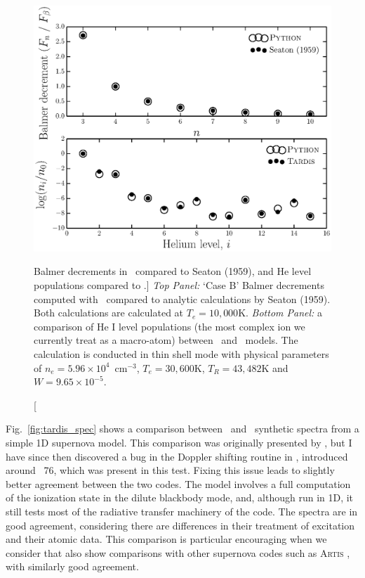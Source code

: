 \begin{figure}
\centering
\includegraphics[width=1.0\textwidth]{figures/05-cvpaper/fig_caseb_tardis.eps}
\caption
[Balmer decrements in \py\ compared to Seaton (1959), and He level populations
compared to \tar.]
{
{\sl Top Panel:} `Case B' Balmer decrements computed 
with \py\ compared to analytic calculations
by Seaton (1959). Both calculations are calculated at $T_e=10,000$K.
{\sl Bottom Panel:}  a comparison of He I level populations (the most complex ion we currently 
treat as a macro-atom) between \py\ and \tar\ models. 
The calculation is conducted in thin shell mode
with physical parameters of $n_e=5.96\times10^4$~cm$^{-3}$,
$T_e=30,600$K, $T_R=43,482$K and $W=9.65\times10^{-5}$. 
}
\label{fig:caseb_tests}
\end{figure}

Fig.~\ref{fig:tardis_spec} shows a comparison 
between \tar\ and \py\ synthetic spectra from 
a simple 1D supernova model. This comparison was originally presented by
\cite{kerzendorfsim}, but I have since then discovered a bug in the Doppler shifting
routine in \py, introduced around \py\ 76, which was present in this test. 
Fixing this issue leads to slightly better agreement between the two codes. 
The model involves a full computation of the ionization state in the 
dilute blackbody mode, and, although run in 1D, it 
still tests most of the radiative transfer
machinery of the code. The spectra are in good agreement, considering
there are differences in their treatment of excitation and their atomic data.
This comparison is particular encouraging when we consider
that \cite{kerzendorfsim} also show comparisons with other supernova
codes such as \textsc{Artis} \citep{kromersim2009}, 
with similarly good agreement.

